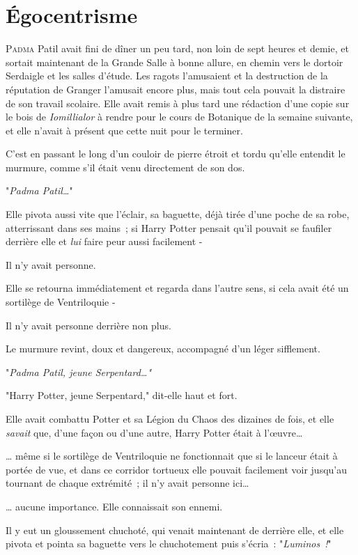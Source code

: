 \chapter{Égocentrisme}

\lettrine{P}{adma} Patil avait fini de dîner un peu tard, non loin de sept heures et demie, et sortait maintenant de la Grande Salle à bonne allure, en chemin vers le dortoir Serdaigle et les salles d'étude. Les ragots l'amusaient et la destruction de la réputation de Granger l'amusait encore plus, mais tout cela pouvait la distraire de son travail scolaire. Elle avait remis à plus tard une rédaction d'une copie sur le bois de \emph{Iomillialor} à rendre pour le cours de Botanique de la semaine suivante, et elle n'avait à présent que cette nuit pour le terminer.

C'est en passant le long d'un couloir de pierre étroit et tordu qu'elle entendit le murmure, comme s'il était venu directement de son dos.

"\emph{Padma Patil…}"

Elle pivota aussi vite que l'éclair, sa baguette, déjà tirée d'une poche de sa robe, atterrissant dans ses mains~; si Harry Potter pensait qu'il pouvait se faufiler derrière elle et \emph{lui} faire peur aussi facilement -

Il n'y avait personne.

Elle se retourna immédiatement et regarda dans l'autre sens, si cela avait été un sortilège de Ventriloquie -

Il n'y avait personne derrière non plus.

Le murmure revint, doux et dangereux, accompagné d'un léger sifflement.

"\emph{Padma Patil, jeune Serpentard…"}

"Harry Potter, jeune Serpentard," dit-elle haut et fort.

Elle avait combattu Potter et sa Légion du Chaos des dizaines de fois, et elle \emph{savait} que, d'une façon ou d'une autre, Harry Potter était à l'œuvre…

… même si le sortilège de Ventriloquie ne fonctionnait que si le lanceur était à portée de vue, et dans ce corridor tortueux elle pouvait facilement voir jusqu'au tournant de chaque extrémité~; il n'y avait personne ici…

… aucune importance. Elle connaissait son ennemi.

Il y eut un gloussement chuchoté, qui venait maintenant de derrière elle, et elle pivota et pointa sa baguette vers le chuchotement puis s'écria~: "\emph{Luminos~!}"

